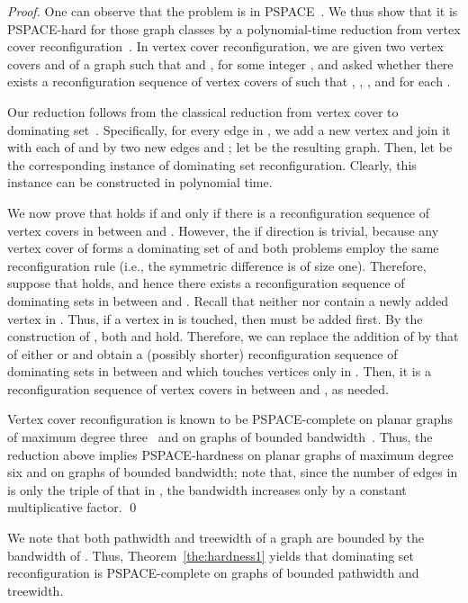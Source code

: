 \documentclass{llncs}
\begin{document}
\begin{proof}
One can observe that the problem is in PSPACE~\cite[Theorem~1]{IDHPSUU}.
We thus show that it is PSPACE-hard for those graph classes by a polynomial-time
reduction from {\sc vertex cover reconfiguration}~\cite{IDHPSUU,INZ14,MNR14}.
In {\sc vertex cover reconfiguration}, we are given two vertex covers  and  of a graph
 such that  and , for some integer , and asked
whether there exists a reconfiguration sequence of vertex covers
 of  such that , , ,
and  for each .
	
Our reduction follows from the classical reduction from {\sc vertex cover} to {\sc dominating set}~\cite{GJ79}.
Specifically, for every edge  in , we add a new vertex 
and join it with each of  and  by two new edges  and ;
let  be the resulting graph.
Then, let  be the corresponding instance of {\sc dominating set reconfiguration}.
Clearly, this instance can be constructed in polynomial time.

We now prove that  holds if and only if there
is a reconfiguration sequence of vertex covers in  between  and .
However, the if direction is trivial, because any vertex cover of
 forms a dominating set of  and both problems employ the same
reconfiguration rule (i.e., the symmetric difference is of size one).
Therefore, suppose that  holds, and hence there exists
a reconfiguration sequence of dominating sets in  between  and .
Recall that neither  nor  contain a newly added vertex in .
Thus, if a vertex  in  is touched, then  must be added first.
By the construction of , both  and  hold.
Therefore, we can replace the addition of  by that of either
 or  and obtain a (possibly shorter) reconfiguration sequence
of dominating sets in  between  and  which touches vertices only in .
Then, it is a reconfiguration sequence of vertex covers in 
between  and , as needed.
	
{\sc Vertex cover reconfiguration} is known to be PSPACE-complete
on planar graphs of maximum degree three~\cite{INZ14,MNR14} and on graphs of bounded bandwidth~\cite{Wro14}.
Thus, the reduction above implies PSPACE-hardness on planar
graphs of maximum degree six and on graphs of bounded bandwidth;
note that, since the number of edges in  is only the
triple of that in , the bandwidth increases only by a constant multiplicative factor.
\qed
\end{proof}

We note that both pathwidth and treewidth
of a graph  are bounded by the bandwidth of .
Thus, Theorem~\ref{the:hardness1} yields that
{\sc dominating set reconfiguration} is PSPACE-complete on
graphs of bounded pathwidth and treewidth.
\end{document}
